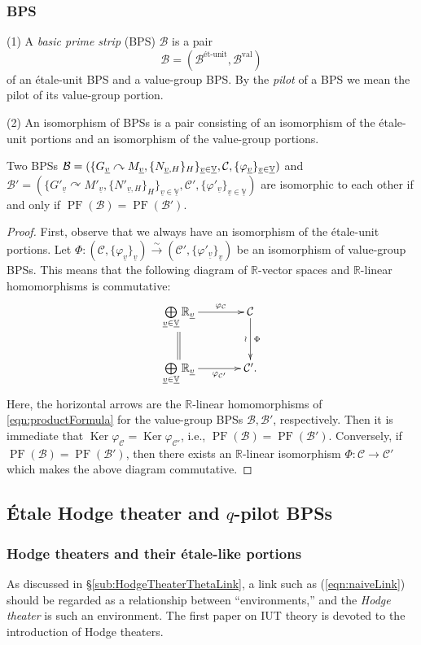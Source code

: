 \documentclass[12pt, reqno, a4paper]{amsart}
\def\udl#1{\underline{#1}} %
\def\simto{\stackrel{\sim}{\rightarrow}} %
\def\acton{\curvearrowright} %
\def\bR{\mathbb{R}} %
\def\bV{\mathbb{V}}
\def\cB{{\mathcal{B}}}
\def\cC{{\mathcal{C}}}
\def\uV{\udl{\bV}} %
\def\uv{\udl{v}} %
\DeclareMathOperator{\PF}{PF}
\begin{document}
\subsubsection{BPS}\label{subsub:BPS}
\begin{dfn}\label{dfn:BPS}
(1) A \emph{basic prime strip} (BPS) $\cB$ is a pair
$$
\cB=(\cB^{\text{\'et-unit}},\cB^{\text{val}})
$$
of an \'etale-unit BPS and a value-group BPS.
By the \emph{pilot} of a BPS we mean the pilot of its value-group portion.

(2) An isomorphism of BPSs is a pair consisting of an isomorphism of the \'etale-unit portions and an isomorphism of the value-group portions.
\end{dfn}


\begin{lem}\label{lem:isomBPS}
Two BPSs $\cB=(\{\GG_{\uv}\acton M_{\uv},\{N_{\uv,H}\}_H\}_{\uv\in\uV},\cC,\{\varphi_{\uv}\}_{\uv\in\uV})$ and $\cB'=(\{G'_{\uv}\acton M'_{\uv},\{N'_{\uv,H}\}_H\}_{\uv\in\uV},\cC',\{\varphi'_{\uv}\}_{\uv\in\uV})$ are isomorphic to each other if and only if $\PF(\cB)=\PF(\cB')$.
\end{lem}

\begin{proof}
First, observe that we always have an isomorphism of the \'etale-unit portions.  Let $\Phi\colon(\cC,\{\varphi_{\uv}\}_{\uv})\simto (\cC',\{\varphi'_{\uv}\}_{\uv})$ be an isomorphism of value-group BPSs.
This means that the following diagram of $\bR$-vector spaces and $\bR$-linear homomorphisms is commutative:
$$
\xymatrix@C+3ex{
\bigoplus\limits_{\uv\in\uV}\bR_{\uv}\ar[r]^-{\varphi_{\cC}}\ar@{=}[d]&\cC\ar[d]_-{\wr}^-{\Phi}\\
\bigoplus\limits_{\uv\in\uV}\bR_{\uv}\ar[r]_-{\varphi_{\cC'}}&\cC'.
}
$$
Here, the horizontal arrows are the $\bR$-linear homomorphisms of \eqref{eqn:productFormula} for the value-group BPSs $\cB,\cB'$, respectively.  Then it is immediate that $\operatorname{Ker} \varphi_{\cC}=\operatorname{Ker} \varphi_{\cC'}$, i.e., $\PF(\cB)=\PF(\cB')$.
Conversely, if $\PF(\cB)=\PF(\cB')$, then there exists an $\bR$-linear isomorphism $\Phi\colon \cC\to \cC'$ which makes the above diagram commutative.  
\end{proof}


\subsection{\'Etale Hodge theater and $q$-pilot BPSs}\label{sub:EtHT}

\subsubsection{Hodge theaters and their \'etale-like portions}\label{subsub:HT}
As discussed in \S\ref{sub:HodgeTheaterThetaLink}, a link such as (\ref{eqn:naiveLink}) should be regarded as a relationship between ``environments,'' and the {\it Hodge theater} is such an environment. 
The first paper on IUT theory \cite{MR4225473} is devoted to the introduction of Hodge theaters.
\end{document}
